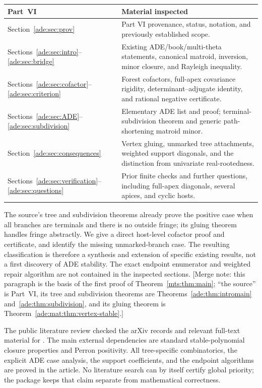 \documentclass[11pt]{article}
\numberwithin{equation}{section}
\theoremstyle{definition}
\begin{document}
\begin{center}\small
\begin{tabularx}{\textwidth}{@{}p{}X@{}}
\toprule
Part~VI & Material inspected\\
\midrule
Section~\ref{ade:sec:prov} & Part VI provenance, status, notation, and previously established scope.\\
Sections~\ref{ade:sec:intro}--\ref{ade:sec:bridge} & Existing ADE/book/multi-theta statements, canonical matroid, inversion,
minor closure, and Rayleigh inequality.\\
Sections~\ref{ade:sec:cofactor}--\ref{ade:sec:criterion} & Forest cofactors, full-apex covariance rigidity, determinant--adjugate
identity, and rational negative certificate.\\
Sections~\ref{ade:sec:ADE}--\ref{ade:sec:subdivision} & Elementary ADE list and proof; terminal-subdivision theorem and generic
path-shortening matroid minor.\\
Section~\ref{ade:sec:consequences} & Vertex gluing, unmarked tree attachments, weighted support diagonals,
and the distinction from univariate real-rootedness.\\
Sections~\ref{ade:sec:verification}--\ref{ade:sec:questions} & Prior finite checks and further questions, including full-apex diagonals,
several apices, and cyclic hosts.\\
\bottomrule
\end{tabularx}
\end{center}

The source's tree and subdivision theorems already prove the positive
case when all branches are terminals and there is no outside fringe;
its gluing theorem handles fringe abstractly. We give a direct host-level
cofactor proof and certificate, and identify the missing unmarked-branch
case. The resulting classification is therefore a synthesis and extension
of specific existing results, not a first discovery of ADE stability.
The exact endpoint enumerator and weighted repair algorithm are not
contained in the inspected sections.
[Merge note: this paragraph is the basis of the first proof of
Theorem~\ref{mts:thm:main}; ``the source'' is Part~VI, its tree and
subdivision theorems are Theorems~\ref{ade:thm:intromain}
and~\ref{ade:thm:subdivision}, and its gluing theorem is
Theorem~\ref{ade:mat:thm:vertex-stable}.]

The public literature review checked the arXiv records and relevant
full-text material for \cite{COSW,Branden,McKeeSmythIMRN,KummerSert}. The main
external dependencies are standard stable-polynomial closure properties
and Perron positivity. All tree-specific combinatorics, the explicit ADE
case analysis, the support coefficients, and the endpoint algorithms are
proved in the article. No literature search can by itself certify global
priority; the package keeps that claim separate from mathematical
correctness.
\end{document}
